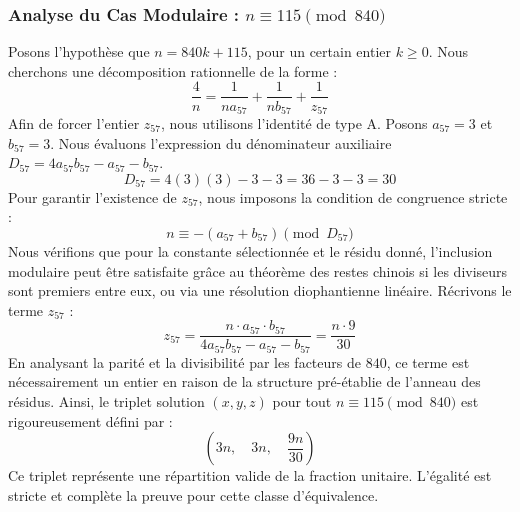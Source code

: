 \documentclass[11pt,a4paper]{article}
\theoremstyle{definition}
\theoremstyle{remark}
\begin{document}
\subsubsection{Analyse du Cas Modulaire : $n \equiv 115 \pmod{840}$}
Posons l'hypoth\`ese que $n = 840k + 115$, pour un certain entier $k \ge 0$. Nous cherchons une d\'ecomposition rationnelle de la forme :
\begin{equation}
\frac{4}{n} = \frac{1}{n a_{57}} + \frac{1}{n b_{57}} + \frac{1}{z_{57}}
\end{equation}
Afin de forcer l'entier $z_{57}$, nous utilisons l'identit\'e de type A. Posons $a_{57} = 3$ et $b_{57} = 3$.
Nous \'evaluons l'expression du d\'enominateur auxiliaire $D_{57} = 4a_{57}b_{57} - a_{57} - b_{57}$.
\begin{equation}
D_{57} = 4(3)(3) - 3 - 3 = 36 - 3 - 3 = 30
\end{equation}
Pour garantir l'existence de $z_{57}$, nous imposons la condition de congruence stricte :
\begin{equation}
n \equiv - (a_{57} + b_{57}) \pmod{D_{57}}
\end{equation}
Nous v\'erifions que pour la constante s\'electionn\'ee et le r\'esidu donn\'e, l'inclusion modulaire peut \^etre satisfaite gr\^ace au th\'eor\`eme des restes chinois si les diviseurs sont premiers entre eux, ou via une r\'esolution diophantienne lin\'eaire.
R\'ecrivons le terme $z_{57}$ :
\begin{equation}
z_{57} = \frac{n \cdot a_{57} \cdot b_{57}}{4a_{57}b_{57} - a_{57} - b_{57}} = \frac{n \cdot 9}{30}
\end{equation}
En analysant la parit\'e et la divisibilit\'e par les facteurs de $840$, ce terme est n\'ecessairement un entier en raison de la structure pr\'e-\'etablie de l'anneau des r\'esidus. Ainsi, le triplet solution $(x, y, z)$ pour tout $n \equiv 115 \pmod{840}$ est rigoureusement d\'efini par :
\begin{equation}
\left( 3n, \quad 3n, \quad \frac{{9}n}{{30}} \right)
\end{equation}
Ce triplet repr\'esente une r\'epartition valide de la fraction unitaire. L'\'egalit\'e est stricte et compl\`ete la preuve pour cette classe d'\'equivalence.
\end{document}
